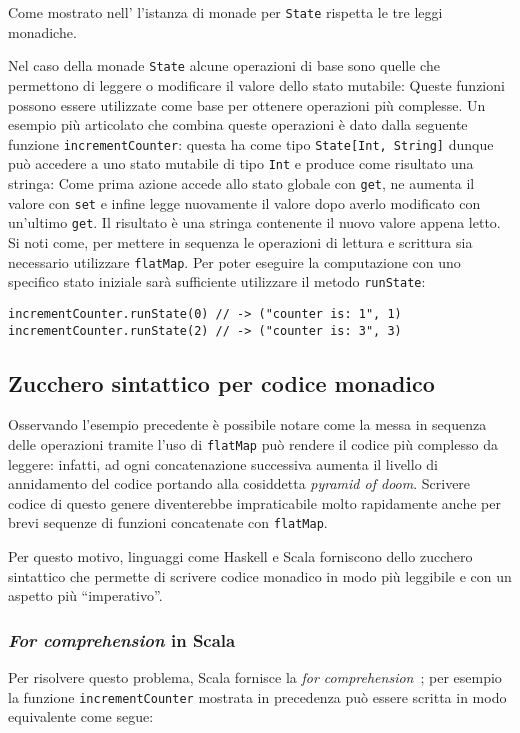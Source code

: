 Come mostrato nell' l'istanza di monade per \lstinline{State} rispetta le tre leggi monadiche.

Nel caso della monade \lstinline{State} alcune operazioni di base sono quelle che permettono di leggere o modificare il valore dello stato mutabile:
Queste funzioni possono essere utilizzate come base per ottenere operazioni più complesse. Un esempio più articolato che combina queste operazioni è dato dalla seguente funzione \lstinline{incrementCounter}: questa ha come tipo \lstinline{State[Int, String]} dunque può accedere a uno stato mutabile di tipo \lstinline{Int} e produce come risultato una stringa:
Come prima azione accede allo stato globale con \lstinline{get}, ne aumenta il valore con \lstinline{set} e infine legge nuovamente il valore dopo averlo modificato con un'ultimo \lstinline{get}. Il risultato è una stringa contenente il nuovo valore appena letto.
Si noti come, per mettere in sequenza le operazioni di lettura e scrittura sia necessario utilizzare \lstinline{flatMap}. Per poter eseguire la computazione con uno specifico stato iniziale sarà sufficiente utilizzare il metodo \lstinline{runState}:
\begin{lstlisting}[language=scala3]
incrementCounter.runState(0) // -> ("counter is: 1", 1)
incrementCounter.runState(2) // -> ("counter is: 3", 3)
\end{lstlisting}

\subsection{Zucchero sintattico per codice monadico}
Osservando l'esempio precedente è possibile notare come la messa in sequenza delle operazioni tramite l'uso di \lstinline{flatMap} può rendere il codice più complesso da leggere: infatti, ad ogni concatenazione successiva aumenta il livello di annidamento del codice portando alla cosiddetta \emph{pyramid of doom}.
Scrivere codice di questo genere diventerebbe impraticabile molto rapidamente anche per brevi sequenze di funzioni concatenate con \lstinline{flatMap}.

Per questo motivo, linguaggi come Haskell e Scala forniscono dello zucchero sintattico che permette di scrivere codice monadico in modo più leggibile e con un aspetto più ``imperativo''.

\subsubsection{\emph{For comprehension} in Scala}
\label{sec:for-comprehension-in-scala}
Per risolvere questo problema, Scala fornisce la \emph{for comprehension}~\cite{cit:scala-book-control-structures}; per esempio la funzione \lstinline{incrementCounter} mostrata in precedenza può essere scritta in modo equivalente come segue:

